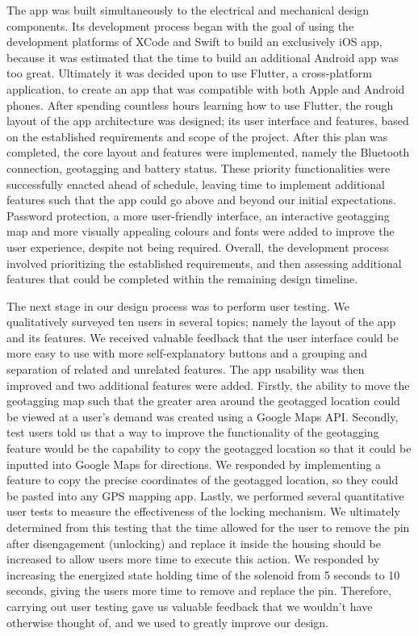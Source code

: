 \documentclass{article}
\begin{document}
The app was built simultaneously to the electrical and mechanical design components. Its development process began with the goal of using the development platforms of XCode and Swift to build an exclusively iOS app, because it was estimated that the time to build an additional Android app was too great. Ultimately it was decided upon to use Flutter, a cross-platform application, to create an app that was compatible with both Apple and Android phones.  After spending countless hours learning how to use Flutter, the rough layout of the app architecture was designed; its user interface and features, based on the established requirements and scope of the project. After this plan was completed, the core layout and features were implemented, namely the Bluetooth connection, geotagging and battery status. These priority functionalities were successfully enacted ahead of schedule, leaving time to implement additional features such that the app could go above and beyond our initial expectations. Password protection, a more user-friendly interface, an interactive geotagging map and more visually appealing colours and fonts were added to improve the user experience, despite not being required. Overall, the development process involved prioritizing the established requirements, and then assessing additional features that could be completed within the remaining design timeline.

The next stage in our design process was to perform user testing. We qualitatively surveyed ten users in several topics; namely the layout of the app and its features. We received valuable feedback that the user interface could be more easy to use with more self-explanatory buttons and a grouping and separation of related and unrelated features. The app usability was then improved and two additional features were added. Firstly, the ability to move the geotagging map such that the greater area around the geotagged location could be viewed at a user's demand was created using a Google Maps API. Secondly, test users told us that a way to improve the functionality of the geotagging feature would be the capability to copy the geotagged location so that it could be inputted into Google Maps for directions. We responded by implementing a feature to copy the precise coordinates of the geotagged location, so they could be pasted into any GPS mapping app. Lastly, we performed several quantitative user tests to measure the effectiveness of the locking mechanism. We ultimately determined from this testing that the time allowed for the user to remove the pin after disengagement (unlocking) and replace it inside the housing should be increased to allow users more time to execute this action. We responded by increasing the energized state holding time of the solenoid from 5 seconds to 10 seconds, giving the users more time to remove and replace the pin. Therefore, carrying out user testing gave us valuable feedback that we wouldn't have otherwise thought of, and we used to greatly improve our design.
\end{document}
